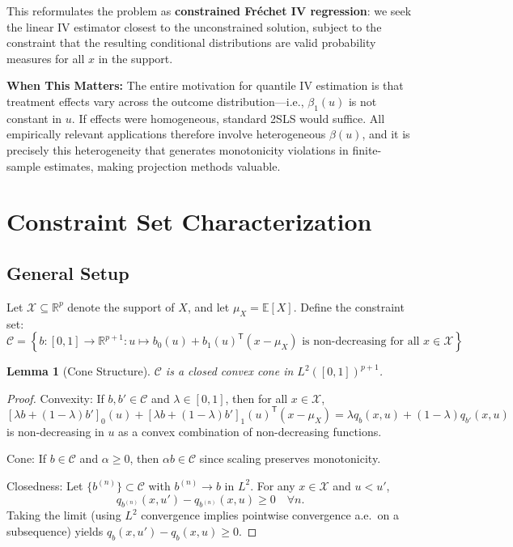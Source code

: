 \documentclass[12pt]{article}
\newcommand{\E}{\mathbb{E}}
\newcommand{\T}{\mathsf{T}}
\newcommand{\R}{\mathbb{R}}
\newtheorem{lemma}{Lemma}
\begin{document}
This reformulates the problem as \textbf{constrained Fréchet IV regression}: we seek the linear IV estimator closest to the unconstrained solution, subject to the constraint that the resulting conditional distributions are valid probability measures for all $x$ in the support.

\textbf{When This Matters:} The entire motivation for quantile IV estimation is that treatment effects vary across the outcome distribution---i.e., $\beta_1(u)$ is not constant in $u$. If effects were homogeneous, standard 2SLS would suffice. All empirically relevant applications therefore involve heterogeneous $\beta(u)$, and it is precisely this heterogeneity that generates monotonicity violations in finite-sample estimates, making projection methods valuable.

\section{Constraint Set Characterization}

\subsection{General Setup}

Let $\mathcal{X} \subseteq \R^p$ denote the support of $X$, and let $\mu_X = \E[X]$. Define the constraint set:
\begin{equation}
\mathcal{C} = \left\{ b : [0,1] \to \R^{p+1} : u \mapsto b_0(u) + b_1(u)^\T(x - \mu_X) \text{ is non-decreasing for all } x \in \mathcal{X} \right\}.
\end{equation}

\begin{lemma}[Cone Structure]
$\mathcal{C}$ is a closed convex cone in $L^2([0,1])^{p+1}$.
\end{lemma}

\begin{proof}
Convexity: If $b, b' \in \mathcal{C}$ and $\lambda \in [0,1]$, then for all $x \in \mathcal{X}$,
\[
[\lambda b + (1-\lambda) b']_0(u) + [\lambda b + (1-\lambda) b']_1(u)^\T(x-\mu_X) = \lambda q_b(x,u) + (1-\lambda) q_{b'}(x,u)
\]
is non-decreasing in $u$ as a convex combination of non-decreasing functions.

Cone: If $b \in \mathcal{C}$ and $\alpha \geq 0$, then $\alpha b \in \mathcal{C}$ since scaling preserves monotonicity.

Closedness: Let $\{b^{(n)}\} \subset \mathcal{C}$ with $b^{(n)} \to b$ in $L^2$. For any $x \in \mathcal{X}$ and $u < u'$,
\[
q_{b^{(n)}}(x,u') - q_{b^{(n)}}(x,u) \geq 0 \quad \forall n.
\]
Taking the limit (using $L^2$ convergence implies pointwise convergence a.e.\ on a subsequence) yields $q_b(x,u') - q_b(x,u) \geq 0$.
\end{proof}
\end{document}
